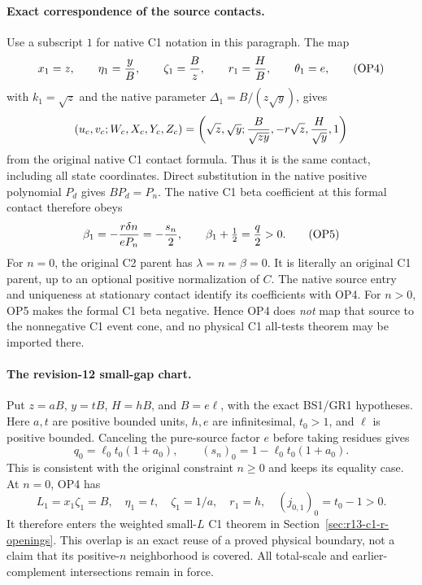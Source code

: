 \paragraph{Exact correspondence of the source contacts.}
Use a subscript $1$ for native C1 notation in this paragraph. The map
\[
 x_1=z,\qquad \eta_1={y\over B},\qquad
 \zeta_1={B\over z},\qquad r_1={H\over B},\qquad
 \theta_1=e,
 \tag{OP4}
\]
with $k_1=\sqrt z$ and the native parameter
$\Delta_1=B/(z\sqrt y)$, gives
\[
 (u_c,v_c;W_c,X_c,Y_c,Z_c)
 =\left(\sqrt z,\sqrt y;{B\over\sqrt{zy}},
                       -r\sqrt z,{H\over\sqrt y},1\right)
\]
from the original native C1 contact formula. Thus it is the same
contact, including all state coordinates. Direct substitution in the
native positive polynomial $P_d$ gives $BP_d=P_n$.
The native C1 beta coefficient at this formal contact therefore obeys
\[
 \beta_1=-{r\delta n\over eP_n}=-{s_n\over2},
 \qquad \beta_1+\tfrac12={q\over2}>0.                 \tag{OP5}
\]
For $n=0$, the original C2 parent has
$\lambda=n=\beta=0$. It is literally an original C1 parent,
up to an optional positive normalization of $C$. The native source
entry and uniqueness at stationary contact identify its coefficients
with OP4. For $n>0$, OP5 makes the formal C1 beta negative. Hence
OP4 does \emph{not} map that source to the nonnegative C1 event cone,
and no physical C1 all-tests theorem may be imported there.

\paragraph{The revision-12 small-gap chart.}
Put $z=aB$, $y=tB$, $H=hB$, and $B=e\ell$, with the exact
BS1/GR1 hypotheses. Here $a,t$ are positive bounded units,
$h,e$ are infinitesimal, $t_0>1$, and $\ell$ is positive bounded.
Canceling the pure-source factor $e$ before taking residues gives
\[
 q_0=\ell_0t_0(1+a_0),\qquad
 (s_n)_0=1-\ell_0t_0(1+a_0).                          \tag{OP6}
\]
This is consistent with the original constraint $n\ge0$ and keeps
its equality case. At $n=0$, OP4 has
\[
 L_1=x_1\zeta_1=B,\quad
 \eta_1=t,\quad\zeta_1=1/a,\quad r_1=h,\quad
 (j_{0,1})_0=t_0-1>0.
\]
It therefore enters the weighted small-$L$ C1 theorem in
Section~\ref{sec:r13-c1-r-openings}. This overlap is an exact reuse
of a proved physical boundary, not a claim that its positive-$n$
neighborhood is covered. All total-scale and earlier-complement
intersections remain in force.

